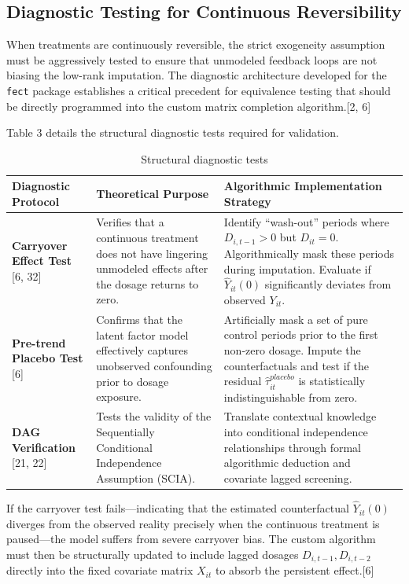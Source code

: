 \documentclass{article}
\begin{document}
\subsection{Diagnostic Testing for Continuous Reversibility}

When treatments are continuously reversible, the strict exogeneity assumption must be aggressively tested to ensure that unmodeled feedback loops are not biasing the low-rank imputation. The diagnostic architecture developed for the \texttt{fect} package establishes a critical precedent for equivalence testing that should be directly programmed into the custom matrix completion algorithm.[2, 6]

Table 3 details the structural diagnostic tests required for validation.

\begin{table}[h]
\centering
\begin{tabular}{p{} p{} p{}}
\toprule
\textbf{Diagnostic Protocol} & \textbf{Theoretical Purpose} & \textbf{Algorithmic Implementation Strategy} \\
\midrule
\textbf{Carryover Effect Test} [6, 32] & Verifies that a continuous treatment does not have lingering unmodeled effects after the dosage returns to zero. & Identify ``wash-out'' periods where $D_{i, t-1} > 0$ but $D_{it} = 0$. Algorithmically mask these periods during imputation. Evaluate if $\hat{Y}_{it}(0)$ significantly deviates from observed $Y_{it}$. \\
\textbf{Pre-trend Placebo Test} [6] & Confirms that the latent factor model effectively captures unobserved confounding prior to dosage exposure. & Artificially mask a set of pure control periods prior to the first non-zero dosage. Impute the counterfactuals and test if the residual $\hat{\tau}_{it}^{placebo}$ is statistically indistinguishable from zero. \\
\textbf{DAG Verification} [21, 22] & Tests the validity of the Sequentially Conditional Independence Assumption (SCIA). & Translate contextual knowledge into conditional independence relationships through formal algorithmic deduction and covariate lagged screening. \\
\bottomrule
\end{tabular}
\caption{Structural diagnostic tests}
\end{table}

If the carryover test fails---indicating that the estimated counterfactual $\hat{Y}_{it}(0)$ diverges from the observed reality precisely when the continuous treatment is paused---the model suffers from severe carryover bias. The custom algorithm must then be structurally updated to include lagged dosages $D_{i, t-1}, D_{i, t-2}$ directly into the fixed covariate matrix $X_{it}$ to absorb the persistent effect.[6]
\end{document}

